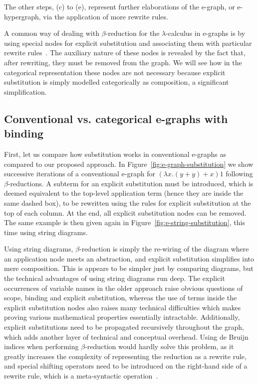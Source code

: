 \documentclass[]{IEEEtran}
\begin{document}
The other steps, (c) to (e), represent further elaborations of the e-graph, or e-hypergraph, via the application of more rewrite rules.

A common way of dealing with $\beta$-reduction for the $\lambda$-calculus in e-graphs is by using special nodes for explicit substitution and associating them with particular rewrite rules~\cite{EggPaper,koehler2022sketchguided}.
The auxiliary nature of these nodes is revealed by the fact that, after rewriting, they must be removed from the graph. 
We will see how in the categorical representation these nodes are not necessary because explicit substitution is simply modelled categorically as composition, a significant simplification.

\subsection{Conventional vs. categorical e-graphs with binding}

First, let us compare how substitution works in conventional e-graphs as compared to our proposed approach.
In Figure~\ref{fig:e-graph-substitution} we show successive iterations of a conventional e-graph for $(\lambda x . (y + y) + x) 1$ following $\beta$-reductions.
A subterm for an explicit substitution must be introduced, which is deemed equivalent to the top-level application term (hence they are inside the same dashed box), to be rewritten using the rules for explicit substitution at the top of each column.
At the end, all explicit substitution nodes can be removed.
The same example is then given again in Figure~\ref{fig:e-string-substitution}, this time using string diagrams. 

Using string diagrams, $\beta$-reduction is simply the re-wiring of the diagram where an application node meets an abstraction, and explicit substitution simplifies into mere composition. 
This is appears to be simpler just by comparing diagrams, but the technical advantages of using string diagrams run deep. 
The explicit occurrences of variable names in the older approach raise obvious questions of scope, binding and explicit substitution, whereas the use of terms inside the explicit substitution nodes also raises many technical difficulties which makes proving various mathematical properties essentially intractable. 
Additionally, explicit substitutions need to be propagated recursively throughout the graph, which adds another layer of technical and conceptual overhead. 
Using de Bruijn indices when performing $\beta$-reduction would hardly solve this problem, as it greatly increases the complexity of representing the reduction as a rewrite rule, and special shifting operators need to be introduced on the right-hand side of a rewrite rule, which is a meta-syntactic operation~\cite{koehler2022sketchguided}.
\end{document}
